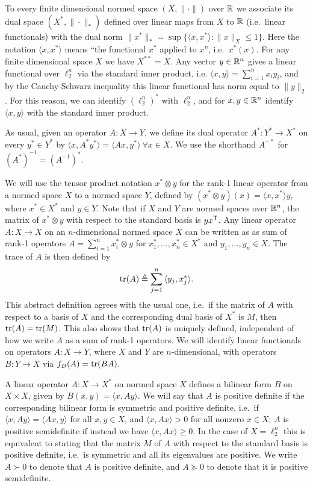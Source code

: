 To every finite dimensional normed space $(X, \|\cdot\|)$ over ${\mathbb{R}}$ we
associate its dual space $(X^*, \|\cdot\|_*)$ defined over linear maps
from $X$ to ${\mathbb{R}}$ (i.e.~linear functionals) with the dual norm
$\|x^*\|_* = \sup\{\langle x, x^*\rangle: \|x\|_X \le 1\}$. Here the
notation $\langle x, x^*\rangle$ means ``the functional $x^*$ applied
to $x$'', i.e.~$x^*(x)$. For any finite dimensional space $X$ we have
$X^{**} = X$. Any vector $y \in {\mathbb{R}}^n$ gives a linear functional over
$\ell_2^n$ via the standard inner product, i.e. $\langle x, y \rangle
= \sum_{i = 1}^n{x_i y_i}$, and by the Cauchy-Schwarz inequality this
linear functional has norm equal to $\|y\|_2$. For this reason, we can
identify $(\ell_2^n)^*$ with $\ell_2^n$, and for $x, y \in {\mathbb{R}}^n$
identify $\langle x , y \rangle$ with the standard inner product.

As usual, given an operator $A:X \to Y$, we define its dual operator
$A^*:Y^* \to X^*$ on every $y^* \in Y^*$ by $\langle x ,
A^*y^*\rangle = \langle Ax, y^*\rangle\ \forall x \in X$. We use the
shorthand $A^{-*}$ for $(A^{*})^{-1} = (A^{-1})^*$. 

We will use the tensor product notation $x^* \otimes y$ for the rank-1
linear operator from a normed space $X$ to a normed space $Y$, defined
by $(x^* \otimes y)(x) = \langle x, x^*\rangle y$, where $x^* \in X^*$
and $y \in Y$. Note that if $X$ and $Y$ are normed spaces over ${\mathbb{R}}^n$,
the matrix of $x^* \otimes y$ with respect to the standard basis is
$yx^\mathsf T$. Any linear operator $A:X \to X$ on an $n$-dimensional normed
space $X$ can be written as as sum of rank-1 operators $A = \sum_{i =
  1}^n{x^*_i \otimes y}$ for $x_1^*, \ldots, x_n^* \in X^*$ and $y_1,
\ldots, y_n \in X$. The trace of $A$ is then defined by
\[
\operatorname{tr}(A) \triangleq \sum_{j = 1}^n{\langle y_j, x^*_j \rangle}.
\]
This abstract definition agrees with the usual one, i.e.~if the matrix
of $A$ with respect to a basis of $X$ and the corresponding dual basis
of $X^*$ is $M$, then $\operatorname{tr}(A) = \operatorname{tr}(M)$. This also shows that $\operatorname{tr}(A)$
is uniquely defined, independent of how we write $A$ as a sum of
rank-1 operators. We will identify linear functionals on operators
$A:X \to Y$, where $X$ and $Y$ are $n$-dimensional, with operators
$B:Y \to X$ via $f_B(A) = \operatorname{tr}(BA)$.

A linear operator $A: X \to X^*$ on normed space $X$ defines a
bilinear form $B$ on $X \times X$, given by $B(x,y) = \langle x, Ay
\rangle$. We will say that $A$ is positive definite if the
corresponding bilinear form is symmetric and positive definite,
i.e.~if $\langle x, Ay \rangle = \langle Ax, y\rangle$ for all $x,y
\in X$, and $\langle x, Ax \rangle >0$ for all nonzero $x \in X$; $A$
is positive semidefinite if instead we have $\langle x, Ax \rangle \ge
0.$ In the case of $X = \ell_2^n$ this is equivalent to stating that
the matrix $M$ of $A$ with respect to the standard basis is positive
definite, i.e.~is symmetric and all its eigenvalues are positive. We
write $A \succ 0$ to denote that $A$ is positive definite, and $A
\succeq 0$ to denote that it is positive semidefinite.

